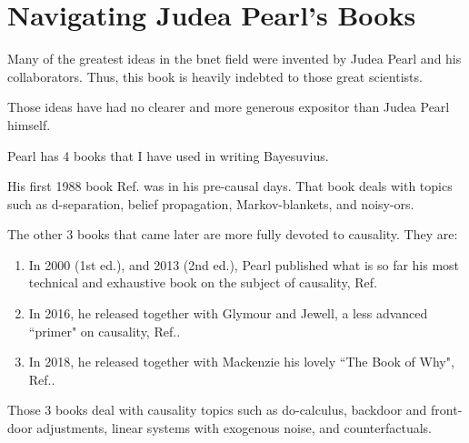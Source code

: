 \section{Navigating Judea Pearl's Books}
\label{ch-nav-pearl}
Many
of the
greatest ideas 
in the bnet field 
were invented by Judea Pearl
and his collaborators.
Thus, this book is 
heavily indebted to
those great scientists.

Those ideas have had no clearer
and more generous 
expositor than Judea Pearl
himself.

Pearl has 
4 books that I have used
in writing Bayesuvius.

His 
first 1988 book Ref.\cite{pearl-1988book}
was in his pre-causal days.
That book
deals with topics such as
d-separation, belief propagation,
Markov-blankets, and noisy-ors.

The other 
3 books that  came later
are more fully devoted to
causality. They are:
\begin{enumerate}
\item
In 2000 (1st ed.), and 2013 (2nd ed.),
Pearl published what
is so far
his most technical
and exhaustive book
on the subject of causality,
Ref\cite{pearl-2013book}.
\item
In 2016,
he released 
together
with Glymour and Jewell,
a less advanced ``primer"
on causality, Ref.\cite{pearl-primer}.
\item
In 2018, 
he released 
together with
Mackenzie his
lovely  ``The Book of Why",
 Ref.\cite{book-why}.
\end{enumerate}
Those 3 books
deal with causality topics
such as do-calculus,
backdoor and front-door
adjustments, 
linear systems with exogenous noise,
and counterfactuals.